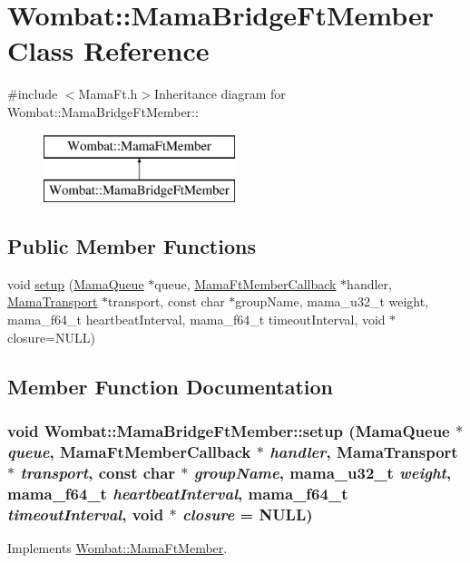 \hypertarget{classWombat_1_1MamaBridgeFtMember}{
\section{Wombat::MamaBridgeFtMember Class Reference}
\label{classWombat_1_1MamaBridgeFtMember}
}


{\ttfamily \#include $<$MamaFt.h$>$}Inheritance diagram for Wombat::MamaBridgeFtMember::\begin{figure}[H]
\begin{center}
\leavevmode
\includegraphics[height=2cm]{classWombat_1_1MamaBridgeFtMember}
\end{center}
\end{figure}
\subsection*{Public Member Functions}
\begin{DoxyCompactItemize}
\item 
void \hyperlink{classWombat_1_1MamaBridgeFtMember_a9b6a49d95ab378ebab4ea353026acbce}{setup} (\hyperlink{classWombat_1_1MamaQueue}{MamaQueue} $\ast$queue, \hyperlink{classWombat_1_1MamaFtMemberCallback}{MamaFtMemberCallback} $\ast$handler, \hyperlink{classWombat_1_1MamaTransport}{MamaTransport} $\ast$transport, const char $\ast$groupName, mama\_\-u32\_\-t weight, mama\_\-f64\_\-t heartbeatInterval, mama\_\-f64\_\-t timeoutInterval, void $\ast$closure=NULL)
\end{DoxyCompactItemize}


\subsection{Member Function Documentation}
\hypertarget{classWombat_1_1MamaBridgeFtMember_a9b6a49d95ab378ebab4ea353026acbce}{
\subsubsection[{setup}]{\setlength{\rightskip}{0pt plus 5cm}void Wombat::MamaBridgeFtMember::setup ({\bf MamaQueue} $\ast$ {\em queue}, \/  {\bf MamaFtMemberCallback} $\ast$ {\em handler}, \/  {\bf MamaTransport} $\ast$ {\em transport}, \/  const char $\ast$ {\em groupName}, \/  mama\_\-u32\_\-t {\em weight}, \/  mama\_\-f64\_\-t {\em heartbeatInterval}, \/  mama\_\-f64\_\-t {\em timeoutInterval}, \/  void $\ast$ {\em closure} = {\ttfamily NULL})}}
\label{classWombat_1_1MamaBridgeFtMember_a9b6a49d95ab378ebab4ea353026acbce}


Implements \hyperlink{classWombat_1_1MamaFtMember_a5a57ce6bb1f5d7ff85eac37acbf4b405}{Wombat::MamaFtMember}.